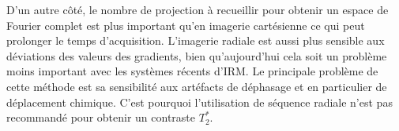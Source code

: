 D'un autre côté, le nombre de projection à recueillir pour obtenir un espace de Fourier complet est plus important qu'en imagerie cartésienne ce qui peut prolonger le temps d'acquisition. L'imagerie radiale est aussi plus sensible aux déviations des valeurs des gradients, bien qu'aujourd'hui cela soit un problème moins important avec les systèmes récents d'IRM. Le principale problème de cette méthode est sa sensibilité aux artéfacts de déphasage et en particulier de déplacement chimique. C'est pourquoi l'utilisation de séquence radiale n'est pas recommandé pour obtenir un contraste $T_2^*$.

